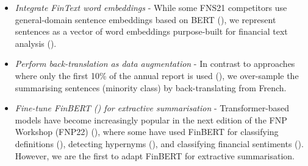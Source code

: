 \begin{itemize}
    \item \emph{Integrate FinText word embeddings} - While some FNS21 competitors use general-domain sentence embeddings
    based on BERT (\cite{litvak-vanetik-2021-summarization, gokhan-etal-2021-extractive}), we represent sentences as
    a vector of word embeddings purpose-built for financial text analysis (\cite{rahimikia2021realised}).
    \item \emph{Perform back-translation as data augmentation} - In contrast to approaches where only the first 10\% of
    the annual report is used (\cite{orzhenovskii-2021-t5}), we over-sample the summarising sentences (minority class)
    by back-translating from French.
    \item \emph{Fine-tune FinBERT (\cite{yang2020finbert}) for extractive summarisation} - Transformer-based models have become increasingly
    popular in the next edition of the FNP Workshop (FNP22) (\cite{khanna-etal-2022-transformer, pant-chopra-2022-multilingual}),
    where some have used FinBERT for classifying definitions (\cite{ghosh-etal-2022-finrad}),
    detecting hypernyms (\cite{peng-etal-2022-discovering}), and classifying financial sentiments (\cite{stepisnik-perdih-etal-2022-sentiment}).
    However, we are the first to adapt FinBERT for extractive summarisation.
\end{itemize}


